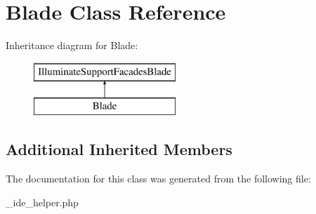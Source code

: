 \hypertarget{class_blade}{}\section{Blade Class Reference}
\label{class_blade}
Inheritance diagram for Blade\+:\begin{figure}[H]
\begin{center}
\leavevmode
\includegraphics[height=2.000000cm]{class_blade}
\end{center}
\end{figure}
\subsection*{Additional Inherited Members}


The documentation for this class was generated from the following file\+:\begin{DoxyCompactItemize}
\item 
\+\_\+ide\+\_\+helper.\+php\end{DoxyCompactItemize}
